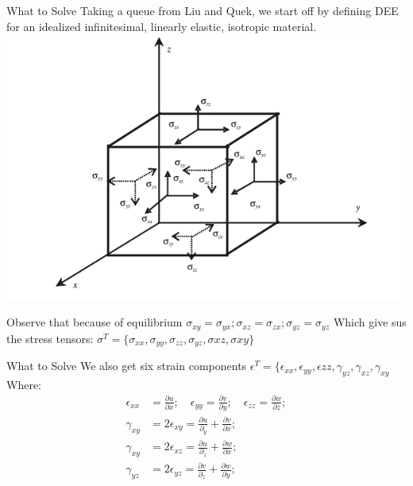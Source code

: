 \documentclass{beamer}
\begin{document}
\begin{frame}{What to Solve}
    Taking a queue from Liu and Quek, we start off by defining DEE for an idealized infinitesimal, linearly elastic, isotropic material.
    \quad\includegraphics[scale = 0.4]{Cube.png}

    Observe that because of equilibrium $\sigma_{xy} = \sigma_{yx}; \sigma_{xz} = \sigma_{zx}; \sigma_{yz}= \sigma_{yz}$ 
    Which give sus the stress tensors: $\sigma^T = \{\sigma_{xx},\sigma_{yy},\sigma_{zz},\sigma_{yz},\sigma{xz},\sigma{xy}\}$
\end{frame}
\begin{frame}{What to Solve}
    We also get six strain components $\epsilon^T = \{\epsilon_{xx},\epsilon_{yy},\epsilon{zz},\gamma_{yz},\gamma_{xz},\gamma_{xy}$
    Where:
    \begin{align*}
        \epsilon_{xx} &= \frac{\partial u }{\partial x}; \quad \epsilon_{yy} = \frac{\partial v}{\partial y}; \quad \epsilon_{zz} = \frac{\partial w}{\partial z};\\
        \gamma_{xy} &= 2\epsilon_{xy} = \frac{\partial u}{\partial_y} + \frac{\partial v}{\partial x}; \\
        \gamma_{xy} &= 2\epsilon_{xz} = \frac{\partial u}{\partial_z} + \frac{\partial w}{\partial x}; \\
        \gamma_{yz} &= 2\epsilon_{yz} = \frac{\partial v}{\partial_z} + \frac{\partial w}{\partial y}; \\
    \end{align*}
\end{frame}
\end{document}
